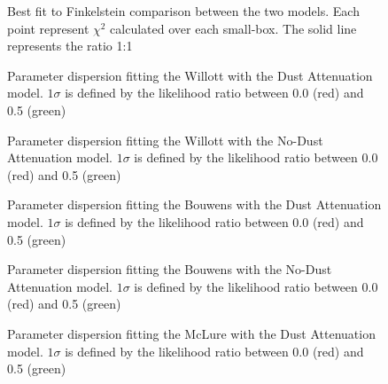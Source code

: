 \documentclass{emulateapj}
\begin{document}
\begin{figure}
\caption{Best fit to Finkelstein comparison between the two models. Each point represent $\chi^2$ 
calculated over each small-box. The solid line represents the ratio 1:1 }
\label{fig:OD4_chi2_comparison}
\end{figure}


\begin{figure}
\caption{Parameter dispersion fitting the Willott with the Dust Attenuation model. 
$1\sigma$ is defined by the likelihood ratio between 0.0 (red) and 0.5 (green)}
\label{fig:OD1_MCMC_best_steps_w}
\end{figure}

\begin{figure}
\caption{Parameter dispersion fitting the Willott with the No-Dust Attenuation model. 
$1\sigma$ is defined by the likelihood ratio between 0.0 (red) and 0.5 (green)}
\label{fig:OD1_MCMC_best_steps_wo}
\end{figure}

\begin{figure}
\caption{Parameter dispersion fitting the Bouwens with the Dust Attenuation model. 
$1\sigma$ is defined by the likelihood ratio between 0.0 (red) and 0.5 (green)}
\label{fig:OD2_MCMC_best_steps_w}
\end{figure}

\begin{figure}
\caption{Parameter dispersion fitting the Bouwens with the No-Dust Attenuation model. 
$1\sigma$ is defined by the likelihood ratio between 0.0 (red) and 0.5 (green)}
\label{fig:OD2_MCMC_best_steps_wo}
\end{figure}
\begin{figure}
\caption{Parameter dispersion fitting the McLure with the Dust Attenuation model. 
$1\sigma$ is defined by the likelihood ratio between 0.0 (red) and 0.5 (green)}
\label{fig:OD3_MCMC_best_steps_w}
\end{figure}
\end{document}
